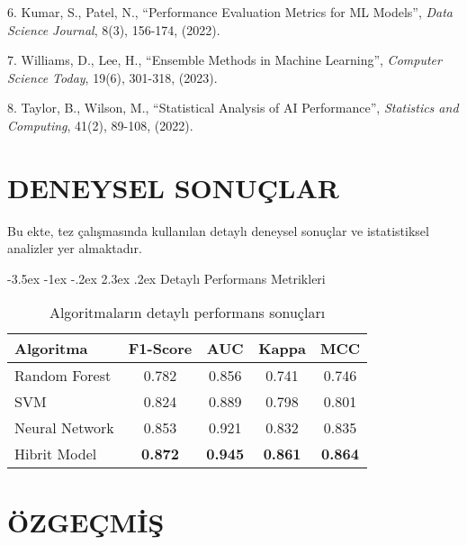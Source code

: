 \documentclass[12pt,a4paper,oneside]{report}
\makeatletter
\renewcommand{\section}{\@startsection{section}{1}{\z@}%
  {-3.5ex \@plus -1ex \@minus -.2ex}%
  {2.3ex \@plus.2ex}%
  {\normalfont\normalsize\bfseries}}
\renewcommand{\thetable}{\thechapter.\arabic{table}}
\renewcommand{\thefigure}{\thechapter.\arabic{figure}}
\makeatother
\begin{document}
6. Kumar, S., Patel, N., ``Performance Evaluation Metrics for ML Models'', \textit{Data Science Journal}, 8(3), 156-174, (2022).

7. Williams, D., Lee, H., ``Ensemble Methods in Machine Learning'', \textit{Computer Science Today}, 19(6), 301-318, (2023).

8. Taylor, B., Wilson, M., ``Statistical Analysis of AI Performance'', \textit{Statistics and Computing}, 41(2), 89-108, (2022).

\onehalfspacing

\appendix
\renewcommand{\thechapter}{\Alph{chapter}}
\renewcommand{\thetable}{\Alph{chapter}.\arabic{table}}
\renewcommand{\thefigure}{\Alph{chapter}.\arabic{figure}}

\chapter{DENEYSEL SONUÇLAR}

\singlespacing %

Bu ekte, tez çalışmasında kullanılan detaylı deneysel sonuçlar ve istatistiksel analizler yer almaktadır.

\section{Detaylı Performans Metrikleri}

\begin{table}[h!]
\centering
\caption{Algoritmaların detaylı performans sonuçları}
\begin{tabular}{|l|c|c|c|c|}
\hline
\textbf{Algoritma} & \textbf{F1-Score} & \textbf{AUC} & \textbf{Kappa} & \textbf{MCC} \\
\hline
Random Forest & 0.782 & 0.856 & 0.741 & 0.746 \\
SVM & 0.824 & 0.889 & 0.798 & 0.801 \\
Neural Network & 0.853 & 0.921 & 0.832 & 0.835 \\
Hibrit Model & \textbf{0.872} & \textbf{0.945} & \textbf{0.861} & \textbf{0.864} \\
\hline
\end{tabular}
\end{table}

\onehalfspacing

\chapter*{ÖZGEÇMİŞ}
\end{document}
